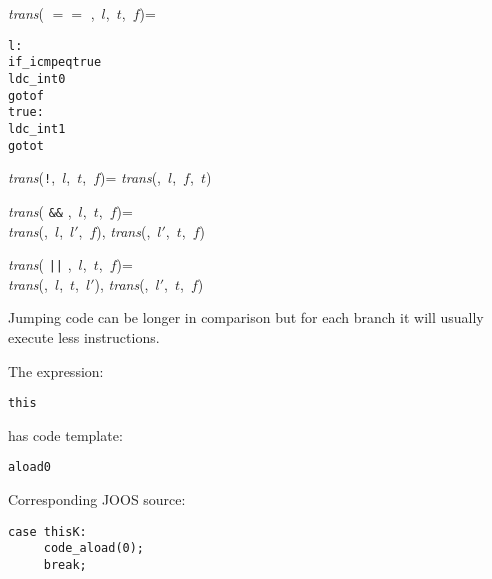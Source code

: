 \begin{slide*}
{\sl trans}( $==$ ,~$l$,~$t$,~$f$)=

\begin{scriptsize}
\begin{alltt}
l: 
   if_icmpeq true
   ldc_int 0
   goto f
   true:
   ldc_int 1
   goto t
\end{alltt}
\end{scriptsize}   

\bigskip

{\sl trans}(\verb"!",~$l$,~$t$,~$f$)= {\sl trans}(,~$l$,~$f$,~$t$)
   
\bigskip

{\sl trans}( \verb"&&" ,~$l$,~$t$,~$f$)=\\
\hspace*{5mm} {\sl trans}(,~$l$,~$l'$,~$f$),
{\sl trans}(,~$l'$,~$t$,~$f$)

\bigskip

{\sl trans}( \verb"||" ,~$l$,~$t$,~$f$)=\\
\hspace*{5mm} {\sl trans}(,~$l$,~$t$,~$l'$),
{\sl trans}(,~$l'$,~$t$,~$f$)

\bigskip
Jumping code can be longer in comparison but for each branch it will
usually execute less instructions.

\vfil 
\end{slide*}

\begin{slide*}
The expression:
 
\begin{scriptsize}
\begin{alltt}
     this
\end{alltt}
\end{scriptsize}
 
has code template:
 
\begin{scriptsize}
\begin{alltt}
     aload 0
\end{alltt}
\end{scriptsize}
 
Corresponding JOOS source:
 
\begin{scriptsize}
\begin{verbatim}
case thisK:
     code_aload(0);
     break;
\end{verbatim}
\end{scriptsize}
\vfil
\end{slide*}

